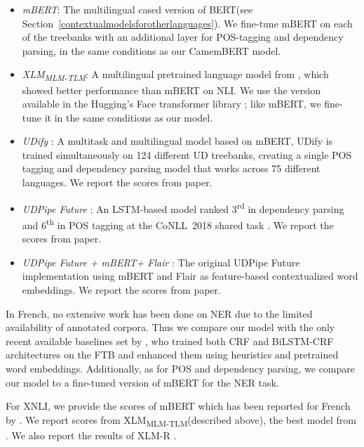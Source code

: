 \documentclass[11pt,a4paper]{article}
\newcommand{\camembert}{CamemBERT\xspace}
\newcommand{\bert}{BERT\xspace}
\newcommand{\mbert}{mBERT\xspace}
\newcommand{\xlmmlmtlm}{XLM\textsubscript{MLM-TLM}\xspace}
\begin{document}
\begin{itemize}
    \item \emph{\mbert}: The multilingual cased version of \bert (see Section~\ref{contextualmodelsforotherlanguages}). We fine-tune \mbert on each of the treebanks with an additional layer for POS-tagging and dependency parsing, in the same conditions as our \camembert model.
    \item \emph{\xlmmlmtlm}: A multilingual pretrained language model from \citet{lample2019cross}, which showed better performance than \mbert on NLI. We use the version available in the Hugging's Face transformer library \cite{Wolf2019HuggingFacesTS}; like \mbert, we fine-tune it in the same conditions as our model.
    \item \emph{UDify} \cite{kondratyuk201975}: A multitask and multilingual model based on \mbert, UDify is trained simultaneously on 124 different UD treebanks, creating a single POS tagging and dependency parsing model that works across 75 different languages. We report the scores from \citet{kondratyuk201975} paper.
    \item \emph{UDPipe Future} \citep{straka2018udpipe}: An LSTM-based model ranked 3\textsuperscript{rd} in dependency parsing and 6\textsuperscript{th} in POS tagging at the CoNLL~2018 shared task \citep{seker2018universal}. We report the scores from \citet{kondratyuk201975} paper.
    \item \emph{UDPipe Future + \mbert + Flair} \citep{straka2019evaluating}: The original UDPipe Future implementation using \mbert and Flair as feature-based contextualized word embeddings. We report the scores from \citet{straka2019evaluating} paper.
\end{itemize}


In French, no extensive work has been done on NER due to the limited availability of annotated corpora. Thus we compare our model with the only recent available baselines set by \citet{dupont2018exploration}, who trained both CRF \citep{lafferty2001conditional} and BiLSTM-CRF \citep{lample2016neural} architectures on the FTB and enhanced them using heuristics and pretrained word embeddings. Additionally, as for POS and dependency parsing, we compare our model to a fine-tuned version of \mbert for the NER task.

For XNLI, we provide the scores of \mbert which has been reported for French by \citet{wu2019beto}.
We report scores from \xlmmlmtlm (described above), the best model from \citet{lample2019cross}. We also report the results of \mbox{XLM-R} \cite{conneau2019xlmr}.
\end{document}
